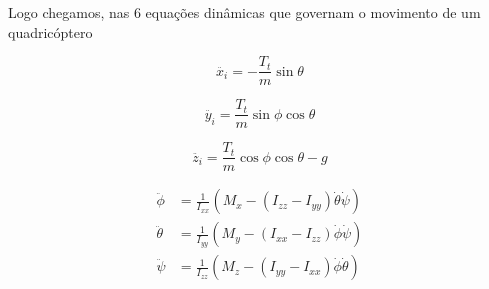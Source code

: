 Logo chegamos, nas 6 equações dinâmicas que governam o movimento de um quadricóptero


\begin{equation}
\ddot{x_i} = -\frac{T_t}{m} \sin\theta
\end{equation}

\begin{equation}
\ddot{y_i} = \frac{T_t}{m} \sin\phi \cos\theta
\end{equation}

\begin{equation}
\ddot{z_i} = \frac{T_t}{m} \cos\phi \cos\theta - g
\end{equation}


\begin{align}
	\ddot{\phi} &= \frac{1}{I_{xx}} \left( M_x - (I_{zz} - I_{yy}) \dot{\theta} \dot{\psi} \right) \\
	\ddot{\theta} &= \frac{1}{I_{yy}} \left( M_y - (I_{xx} - I_{zz}) \dot{\phi} \dot{\psi} \right) \\
	\ddot{\psi} &= \frac{1}{I_{zz}} \left( M_z - (I_{yy} - I_{xx}) \dot{\phi} \dot{\theta} \right)
\end{align}
